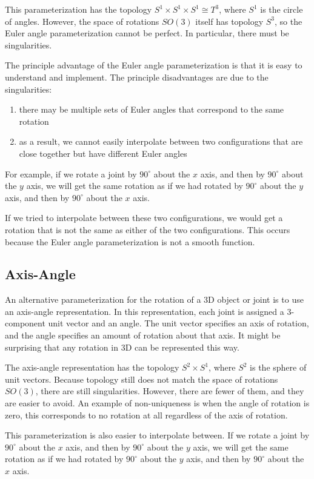 This parameterization has the topology $S^1 \times S^1 \times S^1 ≅ T^3$, where $S^1$ is the circle of angles. However, the space of rotations $SO(3)$ itself has topology $S^3$, so the Euler angle parameterization cannot be perfect. In particular, there must be singularities.

The principle advantage of the Euler angle parameterization is that it is easy to understand and implement. The principle disadvantages are due to the singularities:
\begin{enumerate}
    \item there may be multiple sets of Euler angles that correspond to the same rotation
    \item as a result, we cannot easily interpolate between two configurations that are close together but have different Euler angles
\end{enumerate}

For example, if we rotate a joint by $90^\circ$ about the $x$ axis, and then by $90^\circ$ about the $y$ axis, we will get the same rotation as if we had rotated by $90^\circ$ about the $y$ axis, and then by $90^\circ$ about the $x$ axis.

If we tried to interpolate between these two configurations, we would get a rotation that is not the same as either of the two configurations. This occurs because the Euler angle parameterization is not a smooth function.

\subsection{Axis-Angle}

An alternative parameterization for the rotation of a 3D object or joint is to use an axis-angle representation. In this representation, each joint is assigned a 3-component unit vector and an angle. The unit vector specifies an axis of rotation, and the angle specifies an amount of rotation about that axis. It might be surprising that any rotation in 3D can be represented this way.

The axis-angle representation has the topology $S^2 \times S^1$, where $S^2$ is the sphere of unit vectors. Because topology still does not match the space of rotations $SO(3)$, there are still singularities. However, there are fewer of them, and they are easier to avoid. An example of non-uniqueness is when the angle of rotation is zero, this corresponds to no rotation at all regardless of the axis of rotation.

This parameterization is also easier to interpolate between. If we rotate a joint by $90^\circ$ about the $x$ axis, and then by $90^\circ$ about the $y$ axis, we will get the same rotation as if we had rotated by $90^\circ$ about the $y$ axis, and then by $90^\circ$ about the $x$ axis.

